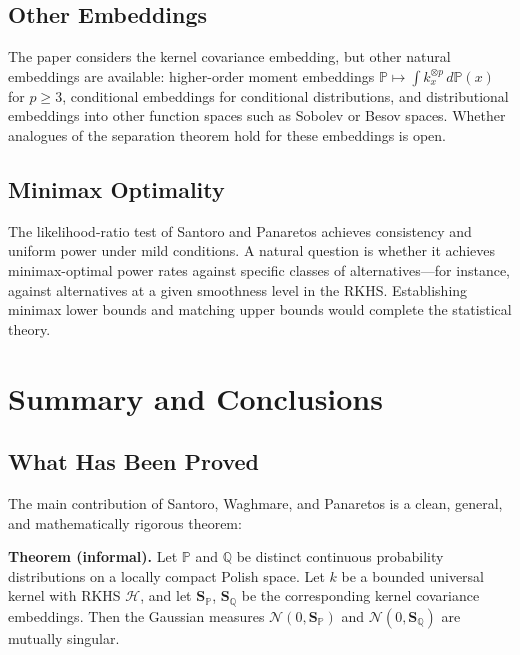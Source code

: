 \documentclass[12pt, oneside]{book}
\theoremstyle{plain}
\theoremstyle{definition}
\newcommand{\calH}{\mathcal{H}}
\newcommand{\calN}{\mathcal{N}}
\newcommand{\PP}{\mathbb{P}}
\newcommand{\QQ}{\mathbb{Q}}
\newcommand{\SP}{\mathbf{S}_{\PP}}
\newcommand{\SQ}{\mathbf{S}_{\QQ}}
\renewcommand{\geq}{\geqslant}
\begin{document}
\section{Other Embeddings}

The paper considers the kernel covariance embedding, but other natural embeddings are available: higher-order moment embeddings $\PP \mapsto \int k_x^{\otimes p}\, d\PP(x)$ for $p \geq 3$, conditional embeddings for conditional distributions, and distributional embeddings into other function spaces such as Sobolev or Besov spaces. Whether analogues of the separation theorem hold for these embeddings is open.

\section{Minimax Optimality}

The likelihood-ratio test of Santoro and Panaretos achieves consistency and uniform power under mild conditions. A natural question is whether it achieves minimax-optimal power rates against specific classes of alternatives---for instance, against alternatives at a given smoothness level in the RKHS. Establishing minimax lower bounds and matching upper bounds would complete the statistical theory.

\chapter{Summary and Conclusions}
\label{chap:conclusion}

\section{What Has Been Proved}

The main contribution of Santoro, Waghmare, and Panaretos is a clean, general, and mathematically rigorous theorem:

\begin{highlightbox}
\textbf{Theorem (informal).} Let $\PP$ and $\QQ$ be distinct continuous probability distributions on a locally compact Polish space. Let $k$ be a bounded universal kernel with RKHS $\calH$, and let $\SP$, $\SQ$ be the corresponding kernel covariance embeddings. Then the Gaussian measures $\calN(0, \SP)$ and $\calN(0, \SQ)$ are mutually singular.
\end{highlightbox}
\end{document}
